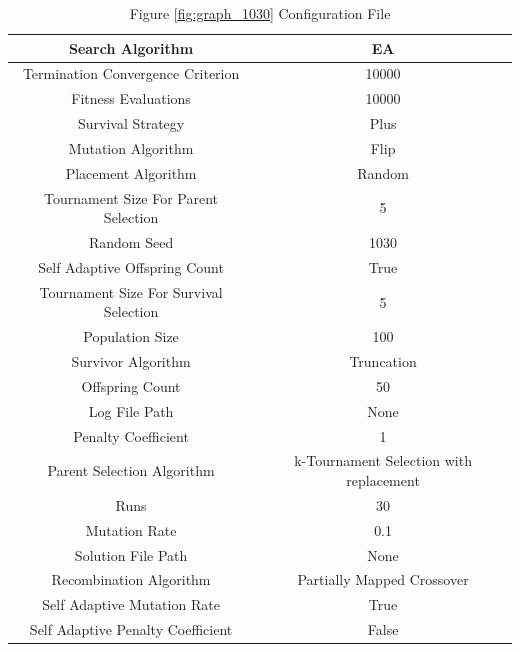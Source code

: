 \documentclass{standalone}
\begin{document}
\begin{table}[!htb]
	\centering
	\caption{Figure \ref{fig:graph_1030} Configuration File}
	\label{tab:graph_1030}
	\begin{tabular}{| c | c |}
		\hline
		Search Algorithm		& EA		 \\
		\hline
		Termination Convergence Criterion		& 10000		 \\
		\hline
		Fitness Evaluations		& 10000		 \\
		\hline
		Survival Strategy		& Plus		 \\
		\hline
		Mutation Algorithm		& Flip		 \\
		\hline
		Placement Algorithm		& Random		 \\
		\hline
		Tournament Size For Parent Selection		& 5		 \\
		\hline
		Random Seed		& 1030		 \\
		\hline
		Self Adaptive Offspring Count		& True		 \\
		\hline
		Tournament Size For Survival Selection		& 5		 \\
		\hline
		Population Size		& 100		 \\
		\hline
		Survivor Algorithm		& Truncation		 \\
		\hline
		Offspring Count		& 50		 \\
		\hline
		Log File Path		& None		 \\
		\hline
		Penalty Coefficient		& 1		 \\
		\hline
		Parent Selection Algorithm		& k-Tournament Selection with replacement		 \\
		\hline
		Runs		& 30		 \\
		\hline
		Mutation Rate		& 0.1		 \\
		\hline
		Solution File Path		& None		 \\
		\hline
		Recombination Algorithm		& Partially Mapped Crossover		 \\
		\hline
		Self Adaptive Mutation Rate		& True		 \\
		\hline
		Self Adaptive Penalty Coefficient		& False		 \\
		\hline
	\end{tabular}
\end{table}
\end{document}
